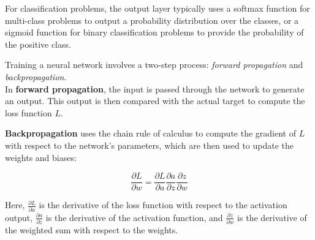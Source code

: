 \begin{figure}[h!]
	\centering
	
	\centering
	
\end{figure}


For classification problems, the output layer typically uses a softmax function for multi-class problems to output a probability distribution over the classes, or a sigmoid function for binary classification problems to provide the probability of the positive class.

Training a neural network involves a two-step process: \textit{forward propagation} and \textit{backpropagation}. \\

In \textbf{forward propagation}, the input is passed through the network to generate an output. This output is then compared with the actual target to compute the loss function $ L $.

\textbf{Backpropagation} uses the chain rule of calculus to compute the gradient of $ L $ with respect to the network's parameters, which are then used to update the weights and biases:

\[
\frac{\partial L}{\partial w} = \frac{\partial L}{\partial a} \frac{\partial a}{\partial z} \frac{\partial z}{\partial w}
\]

Here, $ \frac{\partial L}{\partial a} $ is the derivative of the loss function with respect to the activation output, $ \frac{\partial a}{\partial z} $ is the derivative of the activation function, and $ \frac{\partial z}{\partial w} $ is the derivative of the weighted sum with respect to the weights.

